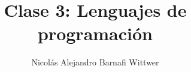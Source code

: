 \documentclass[14pt,aspectratio=169,xcolor=dvipsnames]{beamer}
\title[short title]{Clase 3: Lenguajes de programación}
\subtitle{}
\author[NA Barnafi] {Nicolás Alejandro Barnafi Wittwer}
\institute[UC|CMM] 
{
    Pontificia Universidad Católica de Chile \\
    Centro de Modelamiento Matemático
}
\begin{document}
\begin{frame}
    \maketitle
\end{frame}
\begin{frame}
    \maketitle
\end{frame}
\end{document}
